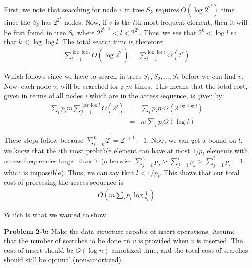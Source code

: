 \documentclass[psamsfonts]{amsart}
\newenvironment{sol}{\vspace{0.25cm}{\large \bfseries Solution:}}{\qedsymbol}
\newenvironment{prob}[1]{\begin{framed}{\large \bfseries Problem #1:}}{\end{framed}}
\begin{document}
\begin{sol}
First, we note that searching for node $v$ in tree $S_k$ requires $O(\log 2^{2^k})$ time since the $S_k$ has $2^{2^k}$ nodes. Now, if $v$ is the $l$th most frequent element, then it will be first found in tree $S_k$ where $2^{2^{k-1}} < l < 2^{2^{k}}$. Thus, we see that $2^k < \log l$ so that $k < \log \log l$. The total search time is therefore:
\begin{eqnarray}
\sum_{i=1}^{\log \log l} O(\log 2^{2^i}) = \sum_{i=1}^{\log \log i} O(2^i)
\end{eqnarray}

Which follows since we have to search in trees $S_1, S_2, \ldots, S_k$ before we can find $v$. Now, each node $v_i$ will be searched for $p_i m$ times. This means that the total cost, given in terms of all nodes $i$ which are in the access sequence, is given by:
\begin{eqnarray}
\sum_{i} p_i m \sum_{j=1}^{\log \log l} O(2^j) &=& \sum_{i} p_i m O(2^{\log \log l}) \\
&=& m \sum_{i} p_i O(\log l) 
\end{eqnarray}

These steps follow because $\sum_{i=0}^n 2^i = 2^{n+1} - 1$. Now, we can get a bound on $l$. we know that the $i$th most probable element can have at most $1/p_i$ elements with access frequencies larger than it (otherwise $\sum_{j=1}^n p_j > \sum_{j=1}^i p_j > \sum_{j=1}^i p_i = 1$ which is impossible). Thus, we can say that $l < 1/p_i$. This shows that our total cost of processing the access sequence is 
\begin{eqnarray}
O \left( m \sum_{i} p_i \log \frac{1}{p_i} \right)
\end{eqnarray}

Which is what we wanted to show.
\end{sol}

\begin{prob}{2-b}
Make the data structure capable of insert operations. Assume that the number of searches to be done on $v$ is provided when $v$ is inserted. The cost of insert should be $O(\log n)$ amortized time, and the total cost of searches should still be optimal (non-amortized).
\end{prob}
\end{document}
